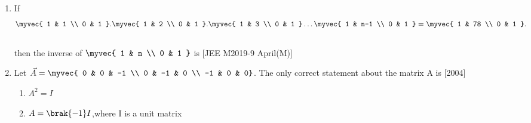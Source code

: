 \begin{enumerate}
\begin{enumerate}
\end{enumerate} 
\item If \begin{align}\myvec{
    1 & 1 \\
    0 & 1
}.\myvec{
    1 & 2 \\
    0 & 1
}.\myvec{
    1 & 3 \\
    0 & 1
}\dots \myvec{
    1 & n-1 \\
    0 & 1
}=\myvec{
    1 & 78 \\
    0 & 1
}.\end{align}\\
then the inverse of $\myvec{
    1 & n \\
    0 & 1
}$ is 
\hfill{[JEE M2019-9 April(M)]} 
\begin{enumerate}
\end{enumerate}
	\item Let $\vec{A}=\myvec{
			0 & 0 & -1 \\
			0 & -1 & 0 \\
			-1 & 0 & 0}$. The only correct statement about the matrix A is \hfill{[2004]}
		\begin{enumerate}
			\item $A^2=I$
			\item $A = \brak{-1}I$,where I is a unit matrix

\end{enumerate}
\end{enumerate}

